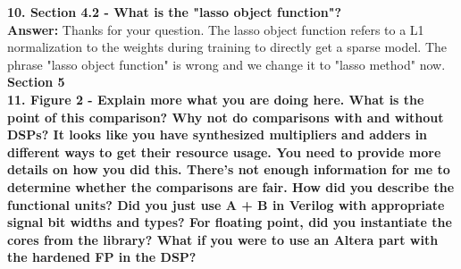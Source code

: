 \documentclass[12pt]{paper}
\newcommand{\answer}[1]{\noindent\textbf{Answer:} #1}
\newcommand{\comment}[1]{\noindent\textbf{#1}\\}
\begin{document}
\comment{10. Section 4.2 - What is the "lasso object function"?}

\answer{Thanks for your question. The lasso object function refers to a L1 normalization to the weights during training to directly get a sparse model. The phrase "lasso object function" is wrong and we change it to "lasso method" now.\\}

{\noindent\textbf{Section 5}}\\

\comment{11. Figure 2 - Explain more what you are doing here. What is the point of this comparison? Why not do comparisons with and without DSPs? It looks like you have synthesized multipliers and adders in different ways to get their resource usage. You need to provide more details on how you did this. There's not enough information for me to determine whether the comparisons are fair. How did you describe the functional units? Did you just use A + B in Verilog with appropriate signal bit widths and types? For floating point, did you instantiate the cores from the library? What if you were to use an Altera part with the hardened FP in the DSP?}
\end{document}
